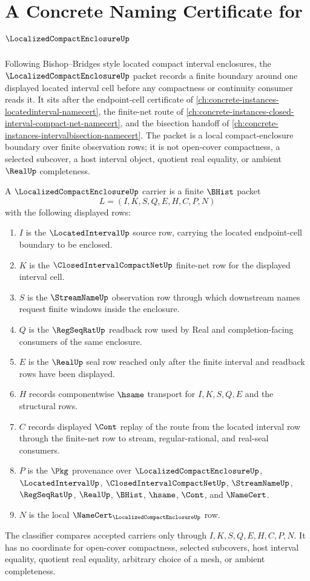 \chapter{A Concrete Naming Certificate for $\LocalizedCompactEnclosureUp$}
\label{ch:concrete-instances-localized-compact-enclosure-namecert}

Following Bishop--Bridges style located compact interval enclosures, the $\LocalizedCompactEnclosureUp$ packet records a finite boundary around one displayed located interval cell before any compactness or continuity consumer reads it. It sits after the endpoint-cell certificate of \autoref{ch:concrete-instances-locatedinterval-namecert}, the finite-net route of \autoref{ch:concrete-instances-closed-interval-compact-net-namecert}, and the bisection handoff of \autoref{ch:concrete-instances-intervalbisection-namecert}. The packet is a local compact-enclosure boundary over finite observation rows; it is not open-cover compactness, a selected subcover, a host interval object, quotient real equality, or ambient $\RealUp$ completeness.

\begin{definition}
\label{def:localized-compact-enclosure-carrier}
A $\LocalizedCompactEnclosureUp$ carrier is a finite $\BHist$ packet
$$
L=(I,K,S,Q,E,H,C,P,N)
$$
with the following displayed rows:
\begin{enumerate}
\item $I$ is the $\LocatedIntervalUp$ source row, carrying the located endpoint-cell boundary to be enclosed.
\item $K$ is the $\ClosedIntervalCompactNetUp$ finite-net row for the displayed interval cell.
\item $S$ is the $\StreamNameUp$ observation row through which downstream names request finite windows inside the enclosure.
\item $Q$ is the $\RegSeqRatUp$ readback row used by Real and completion-facing consumers of the same enclosure.
\item $E$ is the $\RealUp$ seal row reached only after the finite interval and readback rows have been displayed.
\item $H$ records componentwise $\hsame$ transport for $I,K,S,Q,E$ and the structural rows.
\item $C$ records displayed $\Cont$ replay of the route from the located interval row through the finite-net row to stream, regular-rational, and real-seal consumers.
\item $P$ is the $\Pkg$ provenance over $\LocalizedCompactEnclosureUp$, $\LocatedIntervalUp$, $\ClosedIntervalCompactNetUp$, $\StreamNameUp$, $\RegSeqRatUp$, $\RealUp$, $\BHist$, $\hsame$, $\Cont$, and $\NameCert$.
\item $N$ is the local $\NameCert_{\LocalizedCompactEnclosureUp}$ row.
\end{enumerate}
The classifier compares accepted carriers only through $I,K,S,Q,E,H,C,P,N$. It has no coordinate for open-cover compactness, selected subcovers, host interval equality, quotient real equality, arbitrary choice of a mesh, or ambient completeness.
\end{definition}


